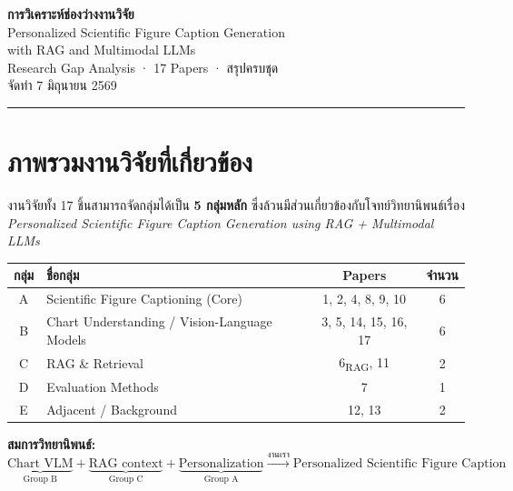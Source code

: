 \documentclass[10pt,a4paper]{article}
\begin{document}
\begin{center}
  {\LARGE \textbf{การวิเคราะห์ช่องว่างงานวิจัย}}\\[6pt]
  {\large Personalized Scientific Figure Caption Generation}\\
  {\large with RAG and Multimodal LLMs}\\[6pt]
  {\color{muted}\small Research Gap Analysis · 17 Papers · สรุปครบชุด}\\[4pt]
  {\color{muted-soft}\small จัดทำ 7 มิถุนายน 2569}
\end{center}

\noindent\rule{\linewidth}{2pt}
\vspace{4pt}

\section{ภาพรวมงานวิจัยที่เกี่ยวข้อง}

งานวิจัยทั้ง 17 ชิ้นสามารถจัดกลุ่มได้เป็น \textbf{5 กลุ่มหลัก} ซึ่งล้วนมีส่วนเกี่ยวข้องกับโจทย์วิทยานิพนธ์เรื่อง
\emph{Personalized Scientific Figure Caption Generation using RAG + Multimodal LLMs}

\begin{center}
\begin{tabular}{@{}clcc@{}}
  \toprule
  \textbf{กลุ่ม} & \textbf{ชื่อกลุ่ม} & \textbf{Papers} & \textbf{จำนวน} \\
  \midrule
  A & Scientific Figure Captioning (Core)          & 1, 2, 4, 8, 9, 10 & 6 \\
  B & Chart Understanding / Vision-Language Models & 3, 5, 14, 15, 16, 17 & 6 \\
  C & RAG \& Retrieval                              & 6\textsubscript{RAG}, 11 & 2 \\
  D & Evaluation Methods                            & 7 & 1 \\
  E & Adjacent / Background                        & 12, 13 & 2 \\
  \bottomrule
\end{tabular}
\end{center}

\vspace{6pt}
\textbf{สมการวิทยานิพนธ์:} \quad
$\underbrace{\text{Chart VLM}}_{\text{Group B}} + \underbrace{\text{RAG context}}_{\text{Group C}} + \underbrace{\text{Personalization}}_{\text{Group A}} \xrightarrow{\text{งานเรา}} \text{Personalized Scientific Figure Caption}$
\end{document}

